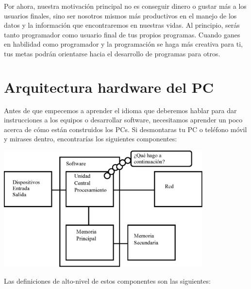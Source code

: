 Por ahora, nuestra motivación principal no es conseguir dinero o gustar más a los usuarios
finales, sino ser nosotros mismos más productivos en el manejo de los datos y la
información que encontraremos en nuestras vidas.
Al principio, serás tanto programador como usuario final de tus propios programas.
Cuando ganes en habilidad como programador y la programación se haga más creativa para ti,
tus metas podrán orientarse hacia el desarrollo de programas para otros.

\section{Arquitectura hardware del PC}

Antes de que empecemos a aprender el idioma que deberemos hablar
para dar instrucciones a los equipos o desarrollar
software, necesitamos aprender un poco acerca de cómo
están construidos los PCs. Si desmontaras
tu PC o teléfono móvil y mirases dentro,
encontrarías los siguientes componentes:

\beforefig
\centerline{\includegraphics[height=2.50in]{figs2/arch.eps}}
\afterfig

Las definiciones de alto-nivel de estos componentes son las siguientes:


